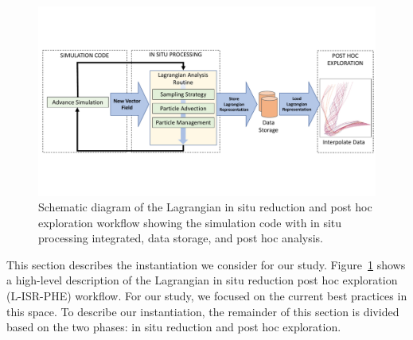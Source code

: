 \begin{figure}[!t]
\centering
\includegraphics[width=0.9\linewidth,trim={0cm 4.3cm 0cm 4.3cm}, clip ]{Images/Schematic.pdf}
\vspace{-2mm}
\caption{Schematic diagram of the Lagrangian in situ reduction and post hoc exploration workflow showing the simulation code with in situ processing integrated, data storage, and post hoc analysis.}
\vspace{-5mm}
\label{fig:schematic}
\end{figure}

%

This section describes the instantiation we consider for our study.
%
Figure~\ref{fig:schematic} shows a high-level description of the Lagrangian in situ reduction post hoc exploration (L-ISR-PHE) workflow. 
%
%
For our study, we focused on the current best practices in this space.
%
To describe our instantiation, the remainder of this section is divided based on the two phases: in situ reduction and post hoc exploration. 
%

